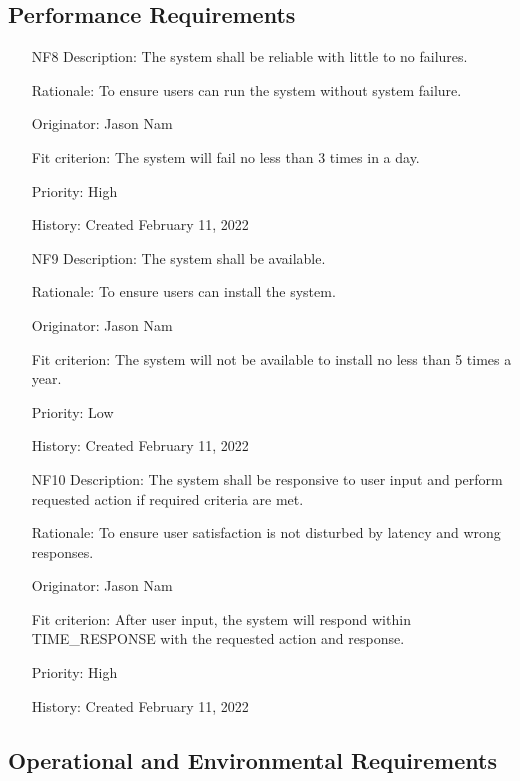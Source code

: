 \documentclass[12pt, titlepage]{article}
\begin{document}
\subsection{Performance Requirements}

\begin{itemize}
    \item[NF8]
Description: The system shall be reliable with little to no failures.

Rationale: To ensure users can run the system without system failure.

Originator: Jason Nam

Fit criterion: The system will fail no less than 3 times in a day.

Priority: High

History: Created February 11, 2022

    \item[NF9]
Description: The system shall be available.

Rationale: To ensure users can install the system.

Originator: Jason Nam

Fit criterion: The system will not be available to install no less than 5 times a year.

Priority: Low

History: Created February 11, 2022

    \item[NF10]
Description: The system shall be responsive to user input and perform requested action if required criteria are met.

Rationale: To ensure user satisfaction is not disturbed by latency and wrong responses.

Originator: Jason Nam

Fit criterion: After user input, the system will respond within TIME\_RESPONSE with the requested action and response.

Priority: High

History: Created February 11, 2022
\end{itemize}

\subsection{Operational and Environmental Requirements}
\end{document}
